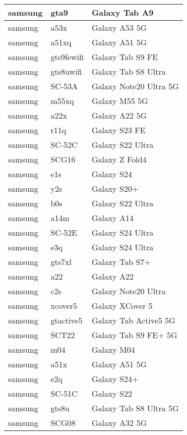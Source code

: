 \begin{tabularx}{\linewidth}{|l|X|X|}
        samsung & gta9 & Galaxy Tab A9 \\ \hline
        samsung & a53x & Galaxy A53 5G \\ \hline
        samsung & a51xq & Galaxy A51 5G \\ \hline
        samsung & gts9fewifi & Galaxy Tab S9 FE \\ \hline
        samsung & gts8uwifi & Galaxy Tab S8 Ultra \\ \hline
        samsung & SC-53A & Galaxy Note20 Ultra 5G \\ \hline
        samsung & m55xq & Galaxy M55 5G \\ \hline
        samsung & a22x & Galaxy A22 5G \\ \hline
        samsung & r11q & Galaxy S23 FE \\ \hline
        samsung & SC-52C & Galaxy S22 Ultra \\ \hline
        samsung & SCG16 & Galaxy Z Fold4 \\ \hline
        samsung & e1s & Galaxy S24 \\ \hline
        samsung & y2s & Galaxy S20+ \\ \hline
        samsung & b0s & Galaxy S22 Ultra \\ \hline
        samsung & a14m & Galaxy A14 \\ \hline
        samsung & SC-52E & Galaxy S24 Ultra \\ \hline
        samsung & e3q & Galaxy S24 Ultra \\ \hline
        samsung & gts7xl & Galaxy Tab S7+ \\ \hline
        samsung & a22 & Galaxy A22 \\ \hline
        samsung & c2s & Galaxy Note20 Ultra \\ \hline
        samsung & xcover5 & Galaxy XCover 5 \\ \hline
        samsung & gtactive5 & Galaxy Tab Active5 5G \\ \hline
        samsung & SCT22 & Galaxy Tab S9 FE+ 5G \\ \hline
        samsung & m04 & Galaxy M04 \\ \hline
        samsung & a51x & Galaxy A51 5G \\ \hline
        samsung & e2q & Galaxy S24+ \\ \hline
        samsung & SC-51C & Galaxy S22 \\ \hline
        samsung & gts8u & Galaxy Tab S8 Ultra 5G \\ \hline
        samsung & SCG08 & Galaxy A32 5G \\ \hline

\end{tabularx}
